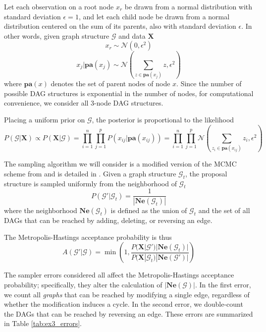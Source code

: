 \documentclass[a4paper,11pt]{article}
\begin{document}
Let each observation on a root node $x_{r}$ be drawn from a normal distribution with standard deviation $\epsilon=1$, and let each child node be drawn from a normal distribution centered on the sum of its parents, also with standard deviation $\epsilon$. In other words, given graph structure $\mathcal{G}$ and data $\mathbf{X}$
\begin{equation}
    x_{r} \sim \mathcal{N}(0, \epsilon^2)
\end{equation}
\begin{equation}
    x_{j}|\mathbf{pa}(x_{j}) \sim \mathcal{N}(\sum_{z \in \mathbf{pa}(x_{j})} z, \epsilon^2)
\end{equation}
where $\mathbf{pa}(x)$ denotes the set of parent nodes of node $x$. Since the number of possible DAG structures is exponential in the number of nodes, for computational convenience, we consider all 3-node DAG structures.

Placing a uniform prior on $\mathcal{G}$, the posterior is proportional to the likelihood
\begin{equation}
    P(\mathcal{G}|\mathbf{X}) \propto P(\mathbf{X}|\mathcal{G}) = \prod_{i=1}^{n} \prod_{j=1}^{p} P(x_{ij}|\mathbf{pa}(x_{ij})) = \prod_{i=1}^{n} \prod_{j=1}^{p}
    \mathcal{N}(\sum_{z_{i} \in \mathbf{pa}(x_{ij})} z_{i}, \epsilon^2)
\end{equation}

The sampling algorithm we will consider is a modified version of the MCMC scheme from \cite{madigan_bayesian_1995} and is detailed in \cite{grzegorczyk_improving_2008}. Given a graph structure $\mathcal{G}_t$, the proposal structure is sampled uniformly from the neighborhood of $\mathcal{G}_t$
\begin{equation}
P(\mathcal{G}' | \mathcal{G}_t) = \frac{1}{|\mathbf{Ne}(\mathcal{G}_t)|}
\end{equation}
where the neighborhood $\mathbf{Ne}(\mathcal{G}_t)$ is defined as the union of $\mathcal{G}_t$ and the set of all DAGs that can be reached by adding, deleting, or reversing an edge.

The Metropolis-Hastings acceptance probability is thus
\begin{equation}
A(\mathcal{G}'|\mathcal{G}) = \min{\left(1,\frac{P(\mathbf{X}|\mathcal{G}')|\mathbf{Ne}(\mathcal{G}_t)|}{P(\mathbf{X}|\mathcal{G}_t)|\mathbf{Ne}(\mathcal{G}')|}\right)}
\end{equation}

The sampler errors considered all affect the Metropolis-Hastings acceptance probability; specifically, they alter the calculation of $|\mathbf{Ne}(\mathcal{G})|$. In the first error, we count all \textit{graphs} that can be reached by modifying a single edge, regardless of whether the modification induces a cycle. In the second error, we double-count the DAGs that can be reached by reversing an edge. These errors are summarized in Table \ref{tab:ex3_errors}.
\end{document}
